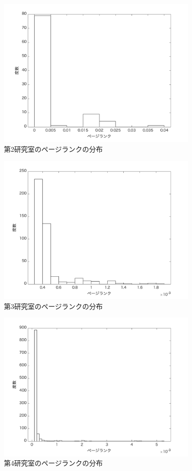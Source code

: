 \documentclass[10pt]{jarticle}
\begin{document}
\begin{figure}[H]
  \begin{center}
  \includegraphics[width=10cm]{../histograms/i2.png}
  \caption{第2研究室のページランクの分布}
  \end{center}
\end{figure}

\begin{figure}[H]
  \begin{center}
  \includegraphics[width=10cm]{../histograms/i3.png}
  \caption{第3研究室のページランクの分布}
  \end{center}
\end{figure}

\begin{figure}[H]
  \begin{center}
  \includegraphics[width=10cm]{../histograms/i4.png}
  \caption{第4研究室のページランクの分布}
  \end{center}
\end{figure}
\end{document}
